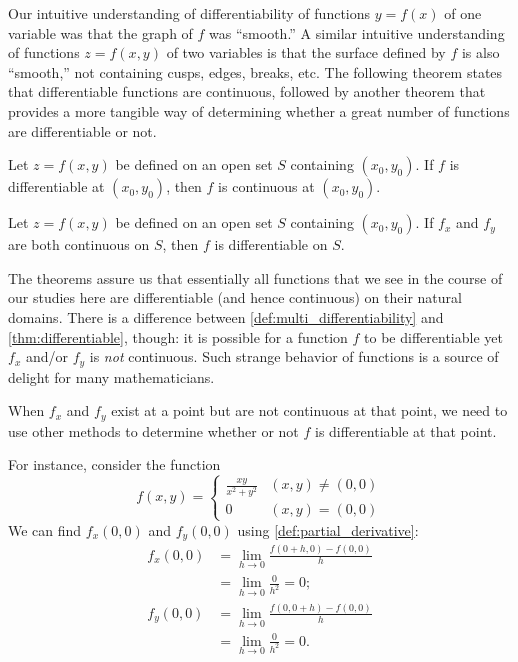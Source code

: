 Our intuitive understanding of differentiability of functions $y=f(x)$ of one variable was that the graph of $f$ was ``smooth.'' A similar intuitive understanding of functions $z=f(x,y)$ of two variables is that the surface defined by $f$ is also ``smooth,'' not containing cusps, edges, breaks,  etc. The following theorem states that differentiable functions are continuous, followed by another theorem that   provides a
more tangible way of determining whether a great number of functions are differentiable or not.

{Let $z=f(x,y)$ be defined on an open set $S$ containing $(x_0,y_0)$. 
If $f$ is differentiable at $(x_0,y_0)$, then $f$ is continuous at $(x_0,y_0)$.
}

{Let $z=f(x,y)$ be defined on an open set $S$ containing $(x_0,y_0)$. 
If $f_x$ and $f_y$ are both continuous on $S$, then $f$ is differentiable on $S$.
}

The theorems assure us that  essentially all functions that we see in the course of our studies here are differentiable (and hence continuous) on their natural domains. There is a difference between \autoref{def:multi_differentiability} and \autoref{thm:differentiable}, though: it is possible for a function $f$ to be differentiable yet $f_x$ and/or $f_y$ is \textit{not} continuous. Such strange behavior of functions is a source of delight for many mathematicians.

When $f_x$ and $f_y$  exist at a point but are not continuous at that point, we need to use other methods to determine whether or not $f$ is differentiable at that point.

For instance, consider the function 
$$f(x,y) = \left\{\begin{array}{cl} \frac{xy}{x^2+y^2} & (x,y)\neq (0,0) \\
																0 & (x,y) = (0,0)\end{array}\right.$$
We can find $f_x(0,0)$ and $f_y(0,0)$ using \autoref{def:partial_derivative}:
\begin{align*}
f_x(0,0) &= \lim_{h\to 0} \frac{f(0+h,0) - f(0,0)}{h} \\
				&= \lim_{h\to 0} \frac{0}{h^2} = 0;\\
f_y(0,0) &= \lim_{h\to 0} \frac{f(0,0+h) - f(0,0)}{h} \\
				&= \lim_{h\to 0} \frac{0}{h^2} = 0.
\end{align*}

